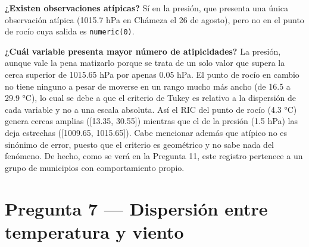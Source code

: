 \documentclass[oneside, openany, fontset=libertinus]{mitthesis}
\begin{document}
\textbf{¿Existen observaciones atípicas?} Sí en la presión, que presenta
una única observación atípica (1015.7 hPa en Chámeza el 26 de agosto),
pero no en el punto de rocío cuya salida es \texttt{numeric(0)}.

\textbf{¿Cuál variable presenta mayor número de atipicidades?} La
presión, aunque vale la pena matizarlo porque se trata de un solo valor
que supera la cerca superior de 1015.65 hPa por apenas 0.05 hPa. El
punto de rocío en cambio no tiene ninguno a pesar de moverse en un rango
mucho más ancho (de 16.5 a 29.9 °C), lo cual se debe a que el criterio
de Tukey es relativo a la dispersión de cada variable y no a una escala
absoluta. Así el RIC del punto de rocío (4.3 °C) genera cercas amplias
({[}13.35, 30.55{]}) mientras que el de la presión (1.5 hPa) las deja
estrechas ({[}1009.65, 1015.65{]}). Cabe mencionar además que atípico no
es sinónimo de error, puesto que el criterio es geométrico y no sabe
nada del fenómeno. De hecho, como se verá en la Pregunta 11, este
registro pertenece a un grupo de municipios con comportamiento propio.

\section{Pregunta 7 --- Dispersión entre temperatura y viento}\label{p7}
\end{document}
